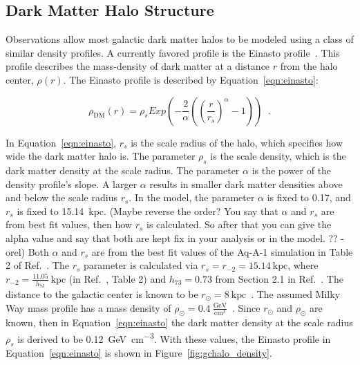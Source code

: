   \subsection{Dark Matter Halo Structure}\label{dm_spatial}
    
    Observations allow most galactic dark matter halos to be modeled using a class of similar density profiles.
    A currently favored profile is the Einasto profile~\cite{einastoprofile1,einastoprofile2}.
    This profile describes the mass-density of dark matter at a distance $r$ from the halo center, $\rho(r)$.
    The Einasto profile is described by Equation~\ref{eqn:einasto}:

    \begin{equation} \label{eqn:einasto}
      \rho_{\textrm{DM}} \left( r \right) = \rho_{s} Exp \left( - \frac{2}{\alpha} \left( {\left( \frac{r}{r_s} \right)}^{\alpha} - 1 \right) \right) \;\; .
    \end{equation}
    
    
    In Equation~\ref{eqn:einasto}, $r_s$ is the scale radius of the halo, which specifies how wide the dark matter halo is.
    The parameter $\rho_s$ is the scale density, which is the dark matter density at the scale radius.
    The parameter $\alpha$ is the power of the density profile's slope.
    A larger $\alpha$ results in smaller dark matter densities above and below the scale radius $r_s$.
    In the model, the parameter $\alpha$ is fixed to 0.17, and $r_s$ is fixed to \SI{15.14}{kpc}.
    {\color{red}(Maybe reverse the order? You say that $\alpha$ and $r_s$ are from best fit values, then how $r_s$ is calculated. So after that you can give the alpha value and say that both are kept fix in your analysis or in the model. ?? -orel)}
    Both $\alpha$ and $r_s$ are from the best fit values of the Aq-A-1 simulation in Table 2 of Ref.~\cite{mw_halo_params}.
    The $r_s$ parameter is calculated via $r_s=r_{-2}=15.14\:\textrm{kpc}$, where $r_{-2}=\frac{11.05}{h_{73}}\:\textrm{kpc}$ (in Ref.~\cite{mw_halo_params}, Table 2) and $h_{73}=0.73$ from Section 2.1 in Ref.~\cite{mw_halo_params}.
    The distance to the galactic center is known to be $r_\odot=8\:\textrm{kpc}$~\cite{gc_distance_1,gc_distance_2,gc_distance_3}.
    The assumed Milky Way mass profile has a mass density of $\rho_\odot = 0.4\:\frac{\textrm{GeV}}{\textrm{cm}^3}$~\cite{local_dm_density,direct_dm_astrophysical_uncertainties}.
    Since $r_\odot$ and $\rho_\odot$ are known, then in Equation~\ref{eqn:einasto} the dark matter density at the scale radius $\rho_s$ is derived to be \SI{0.12}{\GeV\per\cm^3}.
    With these values, the Einasto profile in Equation~\ref{eqn:einasto} is shown in Figure~\ref{fig:gchalo_density}.
  
